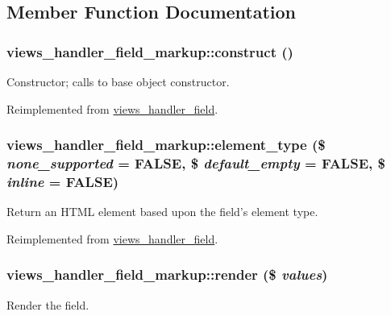 \subsection{Member Function Documentation}
\hypertarget{classviews__handler__field__markup_addc5d6e6130133c1d65d8b96dce502a5}{
\subsubsection[{construct}]{\setlength{\rightskip}{0pt plus 5cm}views\_\-handler\_\-field\_\-markup::construct ()}}
\label{classviews__handler__field__markup_addc5d6e6130133c1d65d8b96dce502a5}
Constructor; calls to base object constructor. 

Reimplemented from \hyperlink{classviews__handler__field_a3d50050864c255b71c842972a45d39f6}{views\_\-handler\_\-field}.\hypertarget{classviews__handler__field__markup_ac8cb32153441482ce1dc79341dfd86c2}{
\subsubsection[{element\_\-type}]{\setlength{\rightskip}{0pt plus 5cm}views\_\-handler\_\-field\_\-markup::element\_\-type (\$ {\em none\_\-supported} = {\ttfamily FALSE}, \/  \$ {\em default\_\-empty} = {\ttfamily FALSE}, \/  \$ {\em inline} = {\ttfamily FALSE})}}
\label{classviews__handler__field__markup_ac8cb32153441482ce1dc79341dfd86c2}
Return an HTML element based upon the field's element type. 

Reimplemented from \hyperlink{classviews__handler__field_a80ea5743144a8608145eb22d23a23d90}{views\_\-handler\_\-field}.\hypertarget{classviews__handler__field__markup_a7a6eb0c91f30643eb29d19dcc76b23d3}{
\subsubsection[{render}]{\setlength{\rightskip}{0pt plus 5cm}views\_\-handler\_\-field\_\-markup::render (\$ {\em values})}}
\label{classviews__handler__field__markup_a7a6eb0c91f30643eb29d19dcc76b23d3}
Render the field.


